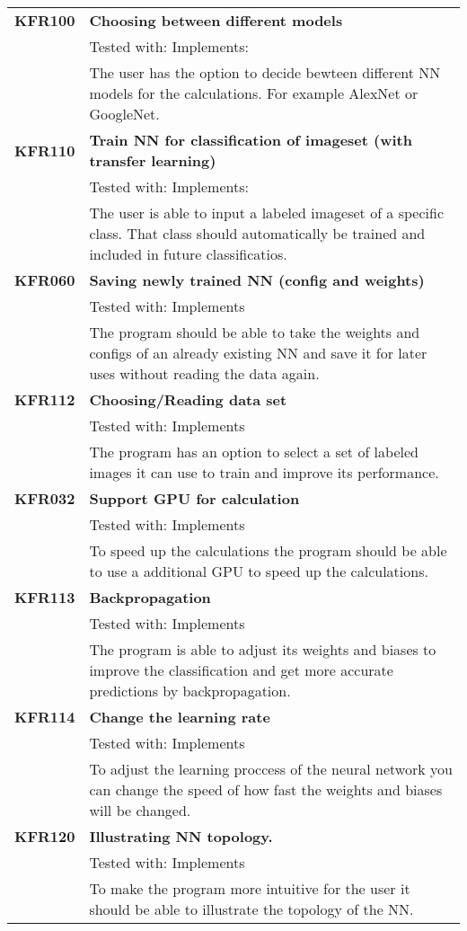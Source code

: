 \documentclass[parskip=full]{scrartcl}
\begin{document}
\begin{tabular}{p{2cm}p{12cm}}
\textbf {KFR100} & \textbf{Choosing between different models}\\
& Tested with: Implements: \\
& The user has the option to decide bewteen different NN models for the calculations. For example AlexNet or GoogleNet. \\
\textbf {KFR110} & \textbf{ Train NN for classification of imageset (with transfer learning)} \\
& Tested with: Implements: \\
& The user is able to input a labeled imageset of a specific class. That class should automatically be trained and included in future classificatios. \\
\textbf {KFR060} & \textbf{Saving newly trained NN (config and weights)} \\
& Tested with: Implements\\
& The program should be able to take the weights and configs of an already existing NN and save it for later uses without reading the data again. \\
\textbf {KFR112} & \textbf{Choosing/Reading data set} \\
& Tested with: Implements\\
& The program has an option to select a set of labeled images it can use to train and improve its performance. \\
\textbf {KFR032} & \textbf{Support GPU for calculation} \\
& Tested with: Implements\\
& To speed up the calculations the program should be able to use a additional GPU to speed up the calculations.\\
\textbf {KFR113} & \textbf{Backpropagation} \\
& Tested with: Implements\\
& The program is able to adjust its weights and biases to improve the classification and get more accurate predictions by backpropagation.\\
\textbf {KFR114} & \textbf{Change the learning rate} \\
& Tested with: Implements\\
& To adjust the learning proccess of the neural network you can change the speed of how fast the weights and biases will be changed.\\
\textbf {KFR120} & \textbf{Illustrating NN topology.} \\
& Tested with: Implements\\
& To make the program more intuitive for the user it should be able to illustrate the topology of the NN.\\

\end{tabular}
\end{document}

